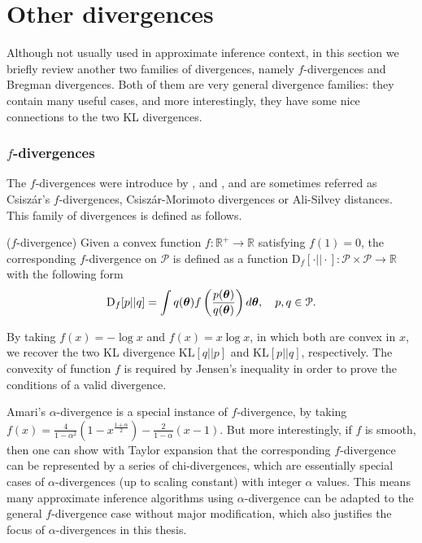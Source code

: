 \section{Other divergences}
\label{sec:appendix_other_divergence}

Although not usually used in approximate inference context, in this section we briefly review another two families of divergences, namely $f$-divergences and Bregman divergences. Both of them are very general divergence families: they contain many useful cases, and more interestingly, they have some nice connections to the two KL divergences.

\subsubsection{$f$-divergences}
The $f$-divergences were introduce by \cite{csiszar:divergence1963}, \cite{morimoto:divergence1963} and \cite{ali:divergence1966}, and are sometimes referred as Csisz{\'a}r's $f$-divergences, Csisz{\'a}r-Morimoto divergences or Ali-Silvey distances. This family of divergences is defined as follows.

\begin{definition}
($f$-divergence)
Given a convex function $f: \mathbb{R}^{+} \rightarrow \mathbb{R}$ satisfying $f(1) = 0$, the corresponding $f$-divergence on $\mathcal{P}$ is defined as a function $\mathrm{D}_{f}[\cdot || \cdot]: \mathcal{P} \times \mathcal{P} \rightarrow \mathbb{R}$ with the following form
\begin{equation}
\mathrm{D}_{f}[p||q] = \int q(\bm{\theta}) f \left( \frac{p(\bm{\theta})}{q(\bm{\theta})} \right) d\bm{\theta}, \quad p, q \in \mathcal{P}.
\label{eq:chap2_f_divergence}
\end{equation}
\label{def:chap2_f_divergence}
\end{definition}
By taking $f(x) = - \log x$ and $f(x) = x \log x$, in which both are convex in $x$, we recover the two KL divergence $\mathrm{KL}[q||p]$ and $\mathrm{KL}[p||q]$, respectively. The convexity of function $f$ is required by Jensen's inequality in order to prove the conditions of a valid divergence.

Amari's $\alpha$-divergence is a special instance of $f$-divergence, by taking $f(x) = \frac{4}{1 - \alpha^2} (1 - x^{\frac{1 + \alpha}{2}}) - \frac{2}{1 - \alpha} (x - 1)$. But more interestingly, if $f$ is smooth, then one can show with Taylor expansion that the corresponding $f$-divergence can be represented by a series of chi-divergences,  which are essentially special cases of $\alpha$-divergences (up to scaling constant) with integer $\alpha$ values. This means many approximate inference algorithms using $\alpha$-divergence can be adapted to the general $f$-divergence case without major modification, which also justifies the focus of $\alpha$-divergences in this thesis.

